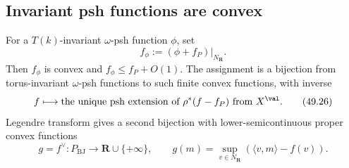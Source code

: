\subsection{Invariant psh functions are convex}
\label{sec:ch49-toric-dictionary}

\begin{theorem}\label{thm:bj-toric-psh-convex}
For a $T(k)$-invariant $\omega$-psh function $\phi$, set
\[
                         f_\phi:=(\phi+f_P)|_{N_{\mathbf R}}.
\tag{49.25}\label{eq:bj-toric-convex-function}
\]
Then $f_\phi$ is convex and $f_\phi\leq f_P+O(1)$.  The assignment is
a bijection from torus-invariant $\omega$-psh functions to such finite convex
functions, with inverse
\[
 f\longmapsto\text{the unique psh extension of }\rho^*(f-f_P)
                    \text{ from }X^{\val}.
\tag{49.26}\label{eq:bj-toric-psh-inverse}
\]
Legendre transform gives a second bijection with lower-semicontinuous
proper convex functions
\[
 g=f^\vee:P_{\mathrm{BJ}}\longrightarrow\mathbf R\cup\{+\infty\},
\qquad
 g(m)=\sup_{v\in N_{\mathbf R}}(\langle v,m\rangle-f(v)).
\tag{49.27}\label{eq:bj-toric-legendre}
\]
\end{theorem}

